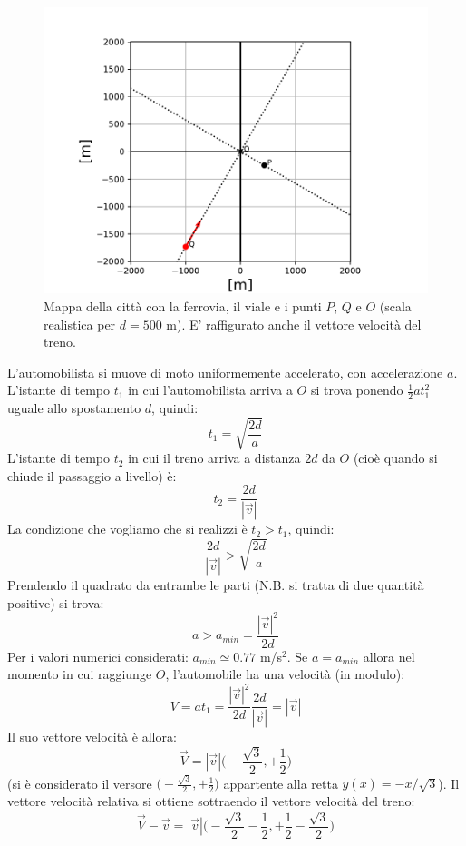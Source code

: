 \documentclass[12pt,a4paper]{book}
\begin{document}
 \begin{figure}[!ht]
 \centering
\includegraphics[scale=0.55]{cartina.pdf}
\caption{Mappa della città con la ferrovia, il viale e i punti $P$, $Q$ e $O$ (scala realistica per $d=500$ m). E' raffigurato anche il vettore velocità del treno.\label{fig:cartina} }
\end{figure}

L'automobilista si muove di moto uniformemente accelerato, con accelerazione $a$. L'istante di tempo $t_1$ in cui l'automobilista arriva a $O$ si trova ponendo $\frac{1}{2}at_1^2$ uguale allo spostamento $d$, quindi:
%
\begin{equation*}
t_1=\sqrt{\frac{2d}{a}}
\end{equation*}
%
L'istante di tempo $t_2$ in cui il treno arriva a distanza $2d$ da $O$ (cioè quando si chiude il passaggio a livello) è:
%
\begin{equation*}
t_2=\frac{2d}{|\vec{v}|}
\end{equation*}
%
La condizione che vogliamo che si realizzi è $t_2>t_1$, quindi:
%
\begin{equation*}
\frac{2d}{|\vec{v}|}>\sqrt{\frac{2d}{a}}
\end{equation*}
%
Prendendo il quadrato da entrambe le parti (N.B. si tratta di due quantità positive) si trova:
%
\begin{equation*}
a>a_{min}=\frac{|\vec{v}|^2}{2d}
\end{equation*}
%
Per i valori numerici considerati: $a_{min}\simeq 0.77$ m/s$^2$. Se $a=a_{min}$ allora nel momento in cui raggiunge $O$, l'automobile ha una velocità (in modulo):
%
\begin{equation*}
V=at_1=\frac{|\vec{v}|^2}{2d}\frac{2d}{|\vec{v}|}=|\vec{v}|
\end{equation*}
%
Il suo vettore velocità è allora:
%
\begin{equation*}
\vec{V}=|\vec{v}| \big(-\frac{\sqrt{3}}{2}, +\frac{1}{2}\big)
\end{equation*}
%
(si è considerato il versore $\big(-\frac{\sqrt{3}}{2}, +\frac{1}{2}\big)$
appartente alla retta $y(x)=-x/\sqrt{3}$).  Il vettore velocità relativa si ottiene sottraendo il vettore velocità del treno:
%
\begin{equation*}
\vec{V} - \vec{v}=|\vec{v}| \big(-\frac{\sqrt{3}}{2} - \frac{1}{2}, +\frac{1}{2} - \frac{\sqrt{3}}{2}\big)
\end{equation*}
%
\end{document}
